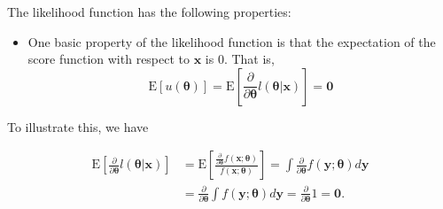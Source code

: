 \documentclass[]{book}
\providecommand{\tightlist}{%
  \setlength{\itemsep}{0pt}\setlength{\parskip}{0pt}}
\theoremstyle{definition}
\theoremstyle{definition}
\theoremstyle{definition}
\theoremstyle{remark}
\begin{document}
The likelihood function has the following properties:

\begin{itemize}
\tightlist
\item
  One basic property of the likelihood function is that the expectation
  of the score function with respect to \(\mathbf{x}\) is 0. That is,
  \[\mathrm{E}[u(\boldsymbol\theta)]=\mathrm{E} \left[ \frac{ \partial}{\partial \boldsymbol \theta}
  l(\boldsymbol \theta|\mathbf{x}) \right] = \mathbf 0\]
\end{itemize}

To illustrate this, we have

\[\begin{aligned}
    \mathrm{E} \left[ \frac{ \partial}{\partial \boldsymbol \theta} l(\boldsymbol \theta|\mathbf{x}) \right]
    &= \mathrm{E} \left[ \frac{\frac{\partial}{\partial \boldsymbol \theta}f(\mathbf{x};\boldsymbol \theta)}{f(\mathbf{x};\boldsymbol \theta )}  \right]
    = \int\frac{\partial}{\partial \boldsymbol \theta} f(\mathbf{y};\boldsymbol \theta ) d \mathbf y \\
    &= \frac{\partial}{\partial \boldsymbol \theta} \int f(\mathbf{y};\boldsymbol \theta ) d \mathbf y
    = \frac{\partial}{\partial \boldsymbol \theta} 1 = \mathbf 0.\end{aligned}\]
\end{document}
